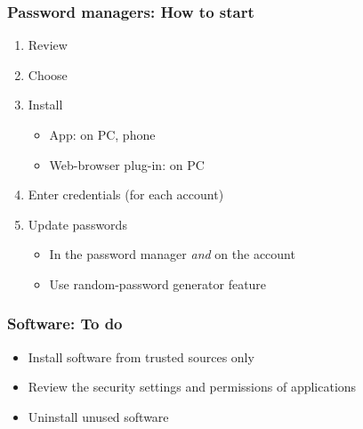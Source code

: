 \documentclass[blue]{beamer}
\begin{document}
\begin{frame}
\frametitle{Password managers: How to start}

\begin{enumerate}
  \item Review
  \item Choose
  \item Install
  \begin{itemize}
    \item App: on PC, phone
    \item Web-browser plug-in: on PC
  \end{itemize}
  \item Enter credentials (for each account)
  \item Update passwords
  \begin{itemize}
    \item In the password manager \emph{and} on the account
    \item Use random-password generator feature
  \end{itemize}
\end{enumerate}

\end{frame}


\begin{frame}
\frametitle{Software: To do}

\begin{itemize}
  \item Install software from trusted sources only
  \item Review the security settings and permissions of applications
  \item Uninstall unused software
\end{itemize}

\end{frame}
\end{document}
